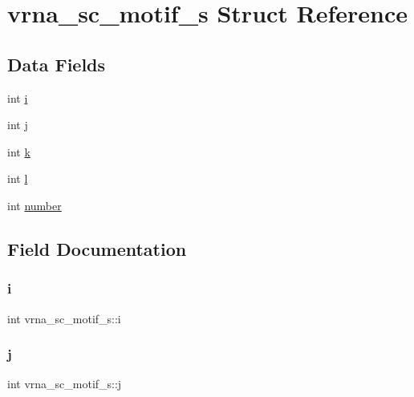 \hypertarget{structvrna__sc__motif__s}{}\section{vrna\+\_\+sc\+\_\+motif\+\_\+s Struct Reference}
\label{structvrna__sc__motif__s}
\subsection*{Data Fields}
\begin{DoxyCompactItemize}
\item 
int \mbox{\hyperlink{structvrna__sc__motif__s_abd830969e3c6339bb6a803a37e40f948}{i}}
\item 
int \mbox{\hyperlink{structvrna__sc__motif__s_a74979b222e2894636f21d95784ce834d}{j}}
\item 
int \mbox{\hyperlink{structvrna__sc__motif__s_a9af97e01f420a4d58f6417665319bba8}{k}}
\item 
int \mbox{\hyperlink{structvrna__sc__motif__s_a398f193e77654a7b0f95e419b0609e46}{l}}
\item 
int \mbox{\hyperlink{structvrna__sc__motif__s_aa0e0d0d6f318220f557b6cd75db7f386}{number}}
\end{DoxyCompactItemize}


\subsection{Field Documentation}
\mbox{\label{structvrna__sc__motif__s_abd830969e3c6339bb6a803a37e40f948}} 
\subsubsection{\texorpdfstring{i}{i}}
{\footnotesize\ttfamily int vrna\+\_\+sc\+\_\+motif\+\_\+s\+::i}

\mbox{\label{structvrna__sc__motif__s_a74979b222e2894636f21d95784ce834d}} 
\subsubsection{\texorpdfstring{j}{j}}
{\footnotesize\ttfamily int vrna\+\_\+sc\+\_\+motif\+\_\+s\+::j}

